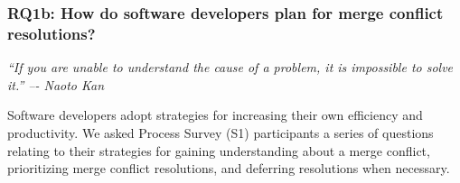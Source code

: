 \subsubsection{\textbf{RQ1b:} How do software developers plan for merge conflict resolutions?}\label{RQ1b}
\vspace*{-0.5\baselineskip}
\begin{quoting}
\textit{``If you are unable to understand the cause of a problem, it is impossible to solve it.'' –- Naoto Kan}
\end{quoting}
\vspace*{+0.3\baselineskip}

Software developers adopt strategies for increasing their own efficiency and productivity.
We asked Process Survey (S1) participants a series of questions relating to their strategies for gaining understanding about a merge conflict, prioritizing merge conflict resolutions, and deferring resolutions when necessary.

